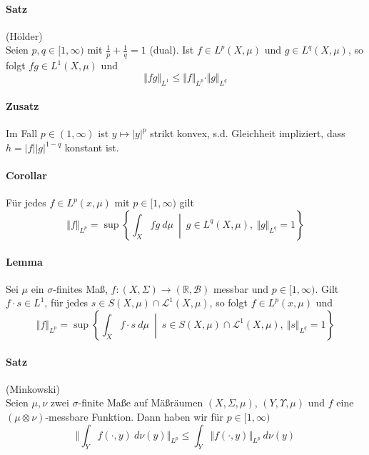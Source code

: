 \documentclass[12pt,a4paper,fleqn]{article}
\def\set#1{{\left\{ #1 \right\}}}
\def\Mid{\ \middle|\ }
\begin{document}
\paragraph{Satz} (Hölder)\\
Seien $p, q \in [1, \infty)$ mit $\frac{1}{p} + \frac{1}{q} = 1$ (dual). Ist $f \in L^p(X, \mu)$ und $g \in L^{q}(X, \mu)$, so folgt $fg \in {L}^1(X, \mu)$ und 
\begin{displaymath}
\Vert fg \Vert_{L^1} \leq \Vert f \Vert_{L^p} \cdot \Vert g \Vert_{L^{q}}
\end{displaymath}

\paragraph{Zusatz} Im Fall $p \in (1, \infty)$ ist $y \mapsto \vert y \vert^p$ strikt konvex, s.d. Gleichheit impliziert, dass $h = \vert f \vert \vert g \vert^{1 - q}$ konstant ist.

\paragraph{Corollar} Für jedes $f \in {L}^p(x, \mu)$ mit $p \in [1, \infty)$ gilt
\begin{displaymath}
\Vert f \Vert_{L^p} = \sup \set{ \int_X fg\ d\mu \Mid g \in L^{q}(X, \mu),\ \Vert g \Vert_{L^{q}} = 1 }
\end{displaymath}

\paragraph{Lemma} Sei $\mu$ ein $\sigma$-finites Maß, $f\colon (X, \Sigma) \rightarrow (\mathbb{R}, \mathcal{B})$ messbar und $p \in [1, \infty)$. Gilt $f \cdot s \in {L}^1$, für jedes $s \in S(X, \mu) \cap \mathscr{L}^1(X, \mu)$, so folgt $f \in {L}^p(x, \mu)$ und 
\begin{displaymath}
\Vert f \Vert_{L^p} = \sup \set{ \int_X f \cdot s\ d\mu \Mid s \in S(X, \mu) \cap \mathscr{L}^1(X, \mu),\ \Vert s \Vert_{L^{q}} = 1 }
\end{displaymath}

\paragraph{Satz} (Minkowski)\\
Seien $\mu, \nu$ zwei $\sigma$-finite Maße auf Mäßräumen $(X, \Sigma, \mu)$, $(Y, \Upsilon, \mu)$ und $f$ eine\linebreak \mbox{$(\mu \otimes \nu)$-messbare} Funktion. Dann haben wir für $p \in [1, \infty)$
\begin{displaymath}
\bigg \Vert \int_Y f(\cdot, y)\ d\nu(y)\bigg\Vert_{L^p} \leq \int_Y \Vert f(\cdot, y) \Vert_{L^p} \ d\nu(y)
\end{displaymath}
\end{document}
